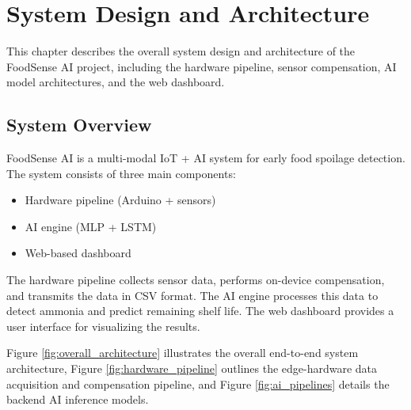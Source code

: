 \chapter{System Design and Architecture}
This chapter describes the overall system design and architecture of the FoodSense AI project, including the hardware pipeline, sensor compensation, AI model architectures, and the web dashboard.

\section{System Overview}
FoodSense AI is a multi-modal IoT + AI system for early food spoilage detection. The system consists of three main components:
\begin{itemize}
    \item Hardware pipeline (Arduino + sensors)
    \item AI engine (MLP + LSTM)
    \item Web-based dashboard
\end{itemize}

The hardware pipeline collects sensor data, performs on-device compensation, and transmits the data in CSV format. The AI engine processes this data to detect ammonia and predict remaining shelf life. The web dashboard provides a user interface for visualizing the results.

Figure \ref{fig:overall_architecture} illustrates the overall end-to-end system architecture, Figure \ref{fig:hardware_pipeline} outlines the edge-hardware data acquisition and compensation pipeline, and Figure \ref{fig:ai_pipelines} details the backend AI inference models.

